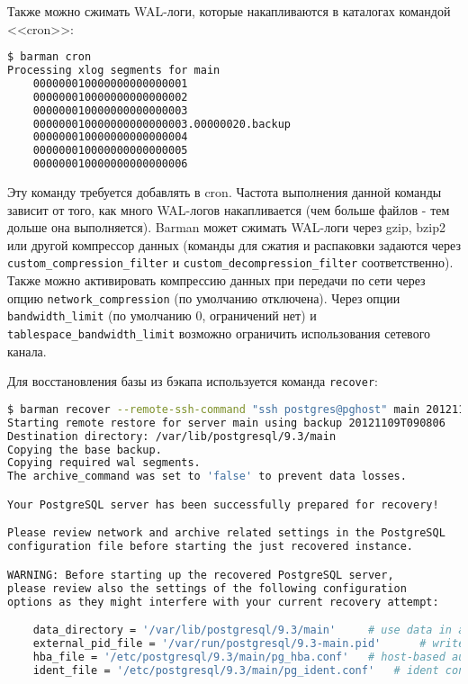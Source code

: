 Также можно сжимать WAL-логи, которые накапливаются в каталогах командой <<cron>>:

\begin{lstlisting}[language=Bash,label=lst:barman16,caption=Архивирование WAL-логов]
$ barman cron
Processing xlog segments for main
	000000010000000000000001
	000000010000000000000002
	000000010000000000000003
	000000010000000000000003.00000020.backup
	000000010000000000000004
	000000010000000000000005
	000000010000000000000006
\end{lstlisting}

Эту команду требуется добавлять в cron. Частота выполнения данной команды зависит от того, как много WAL-логов накапливается (чем больше файлов - тем дольше она выполняется). Barman может сжимать WAL-логи через gzip, bzip2 или другой компрессор данных (команды для сжатия и распаковки задаются через \lstinline!custom_compression_filter! и \lstinline!custom_decompression_filter! соответственно). Также можно активировать компрессию данных при передачи по сети через опцию \lstinline!network_compression! (по умолчанию отключена). Через опции \lstinline!bandwidth_limit! (по умолчанию 0, ограничений нет) и \lstinline!tablespace_bandwidth_limit! возможно ограничить использования сетевого канала.

Для восстановления базы из бэкапа используется команда \lstinline!recover!:

\begin{lstlisting}[language=Bash,label=lst:barman17,caption=Восстановление базы]
$ barman recover --remote-ssh-command "ssh postgres@pghost" main 20121109T090806 /var/lib/postgresql/9.3/main
Starting remote restore for server main using backup 20121109T090806
Destination directory: /var/lib/postgresql/9.3/main
Copying the base backup.
Copying required wal segments.
The archive_command was set to 'false' to prevent data losses.

Your PostgreSQL server has been successfully prepared for recovery!

Please review network and archive related settings in the PostgreSQL
configuration file before starting the just recovered instance.

WARNING: Before starting up the recovered PostgreSQL server,
please review also the settings of the following configuration
options as they might interfere with your current recovery attempt:

    data_directory = '/var/lib/postgresql/9.3/main'		# use data in another directory
    external_pid_file = '/var/run/postgresql/9.3-main.pid'		# write an extra PID file
    hba_file = '/etc/postgresql/9.3/main/pg_hba.conf'	# host-based authentication file
    ident_file = '/etc/postgresql/9.3/main/pg_ident.conf'	# ident configuration file
\end{lstlisting}

